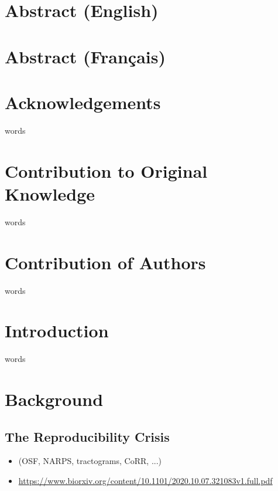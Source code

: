\documentclass[fleqn,12pt]{SelfArx} %
\affiliation{\textit{Biological \& Biomedical Engineering, McGill University, Montréal, QC, Canada}}
\begin{document}
\flushbottom %
\makethesistitle %
\onecolumn
\tableofcontents %

\beginfront
\clearpage
{}
\section{Abstract (English)}
\clearpage

\section{Abstract (Français)}
\clearpage

\section{Acknowledgements}
words
\clearpage

\section{Contribution to Original Knowledge}
words
\clearpage

\section{Contribution of Authors}
words
\clearpage



\section{Introduction}
words

\section{Background}
\subsection{The Reproducibility Crisis}
\begin{itemize}
\item (OSF, NARPS, tractograms, CoRR, ...)
\item \url{https://www.biorxiv.org/content/10.1101/2020.10.07.321083v1.full.pdf}
\end{itemize}
\end{document}
